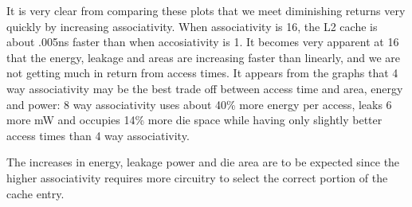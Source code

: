 \documentclass[a4paper, 11pt]{exam}
\begin{document}
\begin{enumerate}
\begin{enumerate}
\begin{figure}[H]
\begin{centering}
\end{centering}
\end{figure}
It is very clear from comparing these plots that we meet diminishing returns
very quickly by increasing associativity. When associativity is 16, the L2 cache
is about .005ns faster than when accosiativity is 1. It becomes very apparent
at 16 that the energy, leakage and areas are increasing faster than linearly, and
we are not getting much in return from access times. It appears from the graphs
that 4 way associativity may be the best trade off between access time and area,
energy and power: 8 way associativity uses about 40\% more energy per access,
leaks 6 more mW and occupies 14\% more die space while having only slightly
better access times than 4 way associativity.

The increases in energy, leakage power and die area are to be expected since
the higher associativity requires more circuitry to select the correct portion
of the cache entry.

\end{enumerate}
\end{enumerate}
\end{document}
